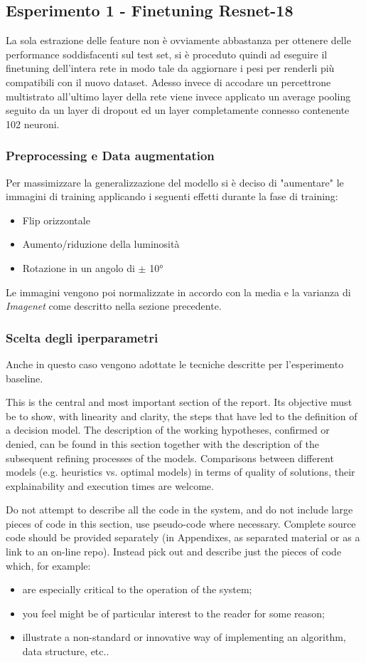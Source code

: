 \subsection{Esperimento 1 - Finetuning Resnet-18}
La sola estrazione delle feature non è ovviamente abbastanza per ottenere delle performance soddisfacenti sul test set, si è proceduto quindi ad eseguire il finetuning dell'intera rete in modo tale da aggiornare i pesi per renderli più compatibili con il nuovo dataset.
Adesso invece di accodare un percettrone multistrato all'ultimo layer della rete viene invece applicato un average pooling seguito da un layer di dropout ed un layer completamente connesso contenente 102 neuroni.
\subsubsection{Preprocessing e Data augmentation}
Per massimizzare la generalizzazione del modello si è deciso di "aumentare" le immagini di training applicando i seguenti effetti durante la fase di training:
\begin{itemize}
\item Flip orizzontale
\item Aumento/riduzione della luminosità 
\item Rotazione in un angolo di $\pm$ 10°
\end{itemize}
Le immagini vengono poi normalizzate in accordo con la media e la varianza di \textit{Imagenet} come descritto nella sezione precedente.
\subsubsection{Scelta degli iperparametri}
Anche in questo caso vengono adottate le tecniche descritte per l'esperimento baseline.

This is the central and most important section of the report. Its objective must be to show, with linearity and clarity, the steps that have led to the definition of a decision model. The description of the working hypotheses, confirmed or denied, can be found in this section together with the description of the subsequent refining processes of the models. Comparisons between different models (e.g. heuristics vs. optimal models) in terms of quality of solutions, their explainability and execution times are welcome. 

Do not attempt to describe all the code in the system, and do not include large pieces of code in this section, use pseudo-code where necessary. Complete source code should be provided separately (in Appendixes, as separated material or as a link to an on-line repo). Instead pick out and describe just the pieces of code which, for example:
\begin{itemize}
\item are especially critical to the operation of the system;
\item you feel might be of particular interest to the reader for some reason;
\item  illustrate a non-standard or innovative way of implementing an algorithm, data
structure, etc..
\end{itemize}

